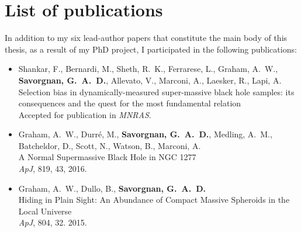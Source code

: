 \chapter*{List of publications}

In addition to my six lead-author papers that constitute the main body of this thesis, 
as a result of my PhD project, I participated in the following publications: 

\begin{itemize}

\item Shankar, F., Bernardi, M., Sheth, R.~K., Ferrarese, L., Graham, A.~W.,
      {\bf Savorgnan, G.~A.~D.}, Allevato, V., Marconi, A., Laesker, R., Lapi, A. \\
      Selection bias in dynamically-measured super-massive black hole samples: 
      its consequences and the quest for the most fundamental relation \\
      Accepted for publication in \emph{MNRAS}. \\

\item Graham, A.~W., Durr\'e, M., {\bf Savorgnan, G.~A.~D.}, Medling, A.~M., 
      Batcheldor, D., Scott, N., Watson, B., Marconi, A. \\
      A Normal Supermassive Black Hole in NGC 1277 \\
      \emph{ApJ}, 819, 43, 2016. \\

\item Graham, A.~W., Dullo, B., {\bf Savorgnan, G.~A.~D.} \\
      Hiding in Plain Sight: An Abundance of Compact Massive Spheroids in the Local Universe \\
      \emph{ApJ}, 804, 32. 2015. \\ 

\end{itemize}
